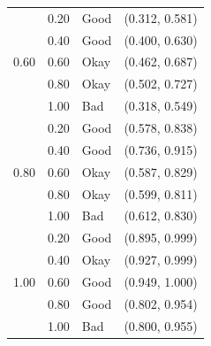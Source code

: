 \documentclass[12pt]{article}
\begin{document}
\begin{table}
\begin{center}
\begin{tabular}{|l|l|l|l|}
        \multirow{5}{*}{0.60}
            & \cellcolor{Yellow}0.20 & \cellcolor{Yellow}Good &
              \cellcolor{Yellow}(0.312, 0.581) \\
            & \cellcolor{Green}0.40 & \cellcolor{Green}Good &
              \cellcolor{Green}(0.400, 0.630) \\
            & \cellcolor{Yellow}0.60 & \cellcolor{Yellow}Okay &
              \cellcolor{Yellow}(0.462, 0.687) \\
            & \cellcolor{Yellow}0.80 & \cellcolor{Yellow}Okay &
              \cellcolor{Yellow}(0.502, 0.727) \\
            & \cellcolor{Red}1.00 & \cellcolor{Red}Bad &
              \cellcolor{Red}(0.318, 0.549) \\
        \hline
        \multirow{5}{*}{0.80}
            & \cellcolor{Green}0.20 & \cellcolor{Green}Good &
              \cellcolor{Green}(0.578, 0.838) \\
            & \cellcolor{Green}0.40 & \cellcolor{Green}Good &
              \cellcolor{Green}(0.736, 0.915) \\
            & \cellcolor{Yellow}0.60 & \cellcolor{Yellow}Okay &
              \cellcolor{Yellow}(0.587, 0.829) \\
            & \cellcolor{Yellow}0.80 & \cellcolor{Yellow}Okay &
              \cellcolor{Yellow}(0.599, 0.811) \\
            & \cellcolor{Red}1.00 & \cellcolor{Red}Bad &
              \cellcolor{Red}(0.612, 0.830) \\
        \hline
        \multirow{5}{*}{1.00}
            & \cellcolor{Yellow}0.20 & \cellcolor{Yellow}Good &
              \cellcolor{Yellow}(0.895, 0.999) \\
            & \cellcolor{Yellow}0.40 & \cellcolor{Yellow}Okay &
              \cellcolor{Yellow}(0.927, 0.999) \\
            & \cellcolor{Green}0.60 & \cellcolor{Green}Good &
              \cellcolor{Green}(0.949, 1.000) \\
            & \cellcolor{Yellow}0.80 & \cellcolor{Yellow}Good &
              \cellcolor{Yellow}(0.802, 0.954) \\
            & \cellcolor{Red}1.00 & \cellcolor{Red}Bad &
              \cellcolor{Red}(0.800, 0.955) \\
        \hline
    \end{tabular}
    \end{center}
    \end{table}
\end{document}
